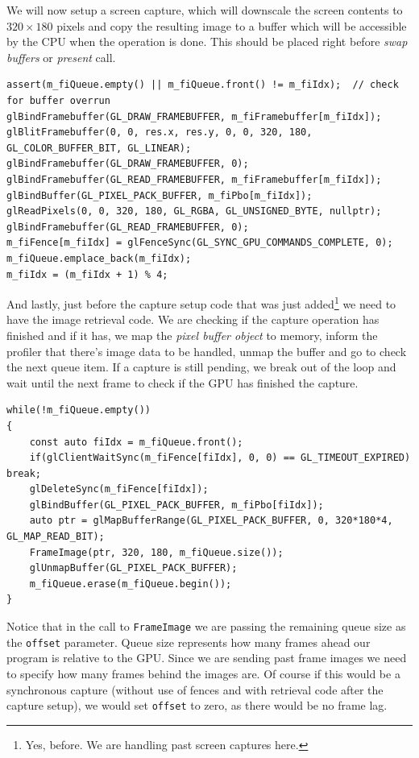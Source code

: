 \documentclass[hidelinks,titlepage,a4paper]{article}
\begin{document}
We will now setup a screen capture, which will downscale the screen contents to $320\times180$ pixels and copy the resulting image to a buffer which will be accessible by the CPU when the operation is done. This should be placed right before \emph{swap buffers} or \emph{present} call.

\begin{lstlisting}
assert(m_fiQueue.empty() || m_fiQueue.front() != m_fiIdx);	// check for buffer overrun
glBindFramebuffer(GL_DRAW_FRAMEBUFFER, m_fiFramebuffer[m_fiIdx]);
glBlitFramebuffer(0, 0, res.x, res.y, 0, 0, 320, 180, GL_COLOR_BUFFER_BIT, GL_LINEAR);
glBindFramebuffer(GL_DRAW_FRAMEBUFFER, 0);
glBindFramebuffer(GL_READ_FRAMEBUFFER, m_fiFramebuffer[m_fiIdx]);
glBindBuffer(GL_PIXEL_PACK_BUFFER, m_fiPbo[m_fiIdx]);
glReadPixels(0, 0, 320, 180, GL_RGBA, GL_UNSIGNED_BYTE, nullptr);
glBindFramebuffer(GL_READ_FRAMEBUFFER, 0);
m_fiFence[m_fiIdx] = glFenceSync(GL_SYNC_GPU_COMMANDS_COMPLETE, 0);
m_fiQueue.emplace_back(m_fiIdx);
m_fiIdx = (m_fiIdx + 1) % 4;
\end{lstlisting}

And lastly, just before the capture setup code that was just added\footnote{Yes, before. We are handling past screen captures here.} we need to have the image retrieval code. We are checking if the capture operation has finished and if it has, we map the \emph{pixel buffer object} to memory, inform the profiler that there's image data to be handled, unmap the buffer and go to check the next queue item. If a capture is still pending, we break out of the loop and wait until the next frame to check if the GPU has finished the capture.

\begin{lstlisting}
while(!m_fiQueue.empty())
{
    const auto fiIdx = m_fiQueue.front();
    if(glClientWaitSync(m_fiFence[fiIdx], 0, 0) == GL_TIMEOUT_EXPIRED) break;
    glDeleteSync(m_fiFence[fiIdx]);
    glBindBuffer(GL_PIXEL_PACK_BUFFER, m_fiPbo[fiIdx]);
    auto ptr = glMapBufferRange(GL_PIXEL_PACK_BUFFER, 0, 320*180*4, GL_MAP_READ_BIT);
    FrameImage(ptr, 320, 180, m_fiQueue.size());
    glUnmapBuffer(GL_PIXEL_PACK_BUFFER);
    m_fiQueue.erase(m_fiQueue.begin());
}
\end{lstlisting}

Notice that in the call to \texttt{FrameImage} we are passing the remaining queue size as the \texttt{offset} parameter. Queue size represents how many frames ahead our program is relative to the GPU. Since we are sending past frame images we need to specify how many frames behind the images are. Of course if this would be a synchronous capture (without use of fences and with retrieval code after the capture setup), we would set \texttt{offset} to zero, as there would be no frame lag.
\end{document}
